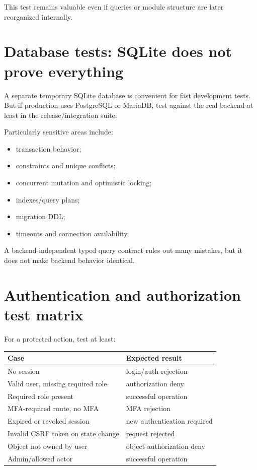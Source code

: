 This test remains valuable even if queries or module structure are later reorganized internally.

\section{Database tests: SQLite does not prove everything}

A separate temporary SQLite database is convenient for fast development tests. But if production uses PostgreSQL or MariaDB, test against the real backend at least in the release/integration suite.

Particularly sensitive areas include:

\begin{itemize}
  \item transaction behavior;
  \item constraints and unique conflicts;
  \item concurrent mutation and optimistic locking;
  \item indexes/query plans;
  \item migration DDL;
  \item timeouts and connection availability.
\end{itemize}

A backend-independent typed query contract rules out many mistakes, but it does not make backend behavior identical.

\section{Authentication and authorization test matrix}

For a protected action, test at least:

\begin{longtable}{L{0.42\textwidth}L{0.44\textwidth}}
\toprule
Case & Expected result \\
\midrule
No session & login/auth rejection \\
Valid user, missing required role & authorization deny \\
Required role present & successful operation \\
MFA-required route, no MFA & MFA rejection \\
Expired or revoked session & new authentication required \\
Invalid CSRF token on state change & request rejected \\
Object not owned by user & object-authorization deny \\
Admin/allowed actor & successful operation \\
\bottomrule
\end{longtable}


